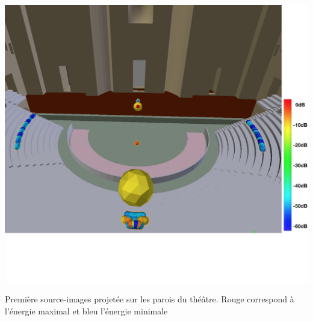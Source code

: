 \begin{figureth}
	\includegraphics[width=0.8\linewidth]{images/si_configInitale}
	\caption{Première source-images projetée sur les parois du théâtre. Rouge correspond à l'énergie maximal et bleu l'énergie minimale}
	\label{si_configInitale}
\end{figureth}

